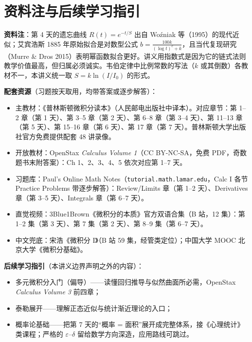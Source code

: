 \documentclass[UTF8,a4paper,11pt]{ctexart}
\begin{document}
\section*{资料注与后续学习指引}

\textbf{资料注}：第 4 天的遗忘曲线 $R(t)=e^{-t/S}$ 出自 Woźniak 等（1995）的现代近似；艾宾浩斯 1885 年原始拟合是对数型公式 $b=\tfrac{100k}{(\log t)^{c}+k}$，且当代复现研究（Murre \& Dros 2015）表明幂函数拟合更好。讲义用指数式是因为它的链式法则教学价值最高，但归属必须诚实。韦伯定律中比例常数的写法（$k$ 或其倒数）各教材不一，本讲义统一取 $S=k\ln(I/I_0)$ 的形式。

\textbf{配套资源}（习题按天取用，均带答案或逐步解答）：
\begin{itemize}
  \item 主教材：《普林斯顿微积分读本》（人民邮电出版社中译本）。对应章节：第 1–2 章（第 1 天）、第 3–5 章（第 2 天）、第 6–8 章（第 3–4 天）、第 11–13 章（第 5 天）、第 15–16 章（第 6 天）、第 17 章（第 7 天）。普林斯顿大学出版社官方免费提供配套 48 讲录像。
  \item 开放教材：OpenStax \emph{Calculus Volume 1}（CC BY-NC-SA，免费 PDF，奇数题书末附答案）：Ch 1、2、3、4、5 依次对应第 1–7 天。
  \item 习题库：Paul's Online Math Notes（\texttt{tutorial.math.lamar.edu}，Calc I 各节 Practice Problems 带逐步解答）：Review/Limits 章（第 1–2 天）、Derivatives 章（第 3–5 天）、Integrals 章（第 6–7 天）。
  \item 直觉视频：3Blue1Brown《微积分的本质》官方双语合集（B 站，12 集）：第 1–2 集（第 3 天）、第 7 集（第 2 天）、第 8–9 集（第 6–7 天）。
  \item 中文兜底：宋浩《微积分 I》（B 站 59 集，经管类定位）；中国大学 MOOC 北京大学《微积分基础》。
\end{itemize}

\textbf{后续学习指引}（本讲义边界声明之外的内容）：
\begin{itemize}
  \item 多元微积分入门（偏导）——读懂回归推导与似然曲面所必需，OpenStax \emph{Calculus Volume 3} 前四章；
  \item 泰勒展开——理解正态近似与统计渐近理论的入口；
  \item 概率论基础——把第 7 天的“概率 = 面积”展开成完整体系，接《心理统计》类课程；严格的 $\varepsilon$–$\delta$ 留给数学方向深造，应用路线可跳过。
\end{itemize}
\end{document}

